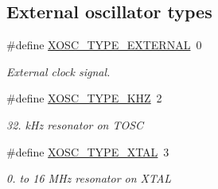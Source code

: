 \subsection*{External oscillator types}
\begin{DoxyCompactItemize}
\item 
\hypertarget{group__osc__group_ga751c1727c2ed38c5c1ae15c6213abc54}{\#define \hyperlink{group__osc__group_ga751c1727c2ed38c5c1ae15c6213abc54}{X\-O\-S\-C\-\_\-\-T\-Y\-P\-E\-\_\-\-E\-X\-T\-E\-R\-N\-A\-L}~0}\label{group__osc__group_ga751c1727c2ed38c5c1ae15c6213abc54}

\begin{DoxyCompactList}\small\item\em External clock signal. \end{DoxyCompactList}\item 
\hypertarget{group__osc__group_ga1a0e7ff0538c085e6c780ec257656be2}{\#define \hyperlink{group__osc__group_ga1a0e7ff0538c085e6c780ec257656be2}{X\-O\-S\-C\-\_\-\-T\-Y\-P\-E\-\_\-K\-H\-Z}~2}\label{group__osc__group_ga1a0e7ff0538c085e6c780ec257656be2}

\begin{DoxyCompactList}\small\item\em 32. k\-Hz resonator on T\-O\-S\-C \end{DoxyCompactList}\item 
\hypertarget{group__osc__group_ga26f4c02f87e700c975ebef100f9dcf22}{\#define \hyperlink{group__osc__group_ga26f4c02f87e700c975ebef100f9dcf22}{X\-O\-S\-C\-\_\-\-T\-Y\-P\-E\-\_\-\-X\-T\-A\-L}~3}\label{group__osc__group_ga26f4c02f87e700c975ebef100f9dcf22}

\begin{DoxyCompactList}\small\item\em 0. to 16 M\-Hz resonator on X\-T\-A\-L \end{DoxyCompactList}\end{DoxyCompactItemize}
